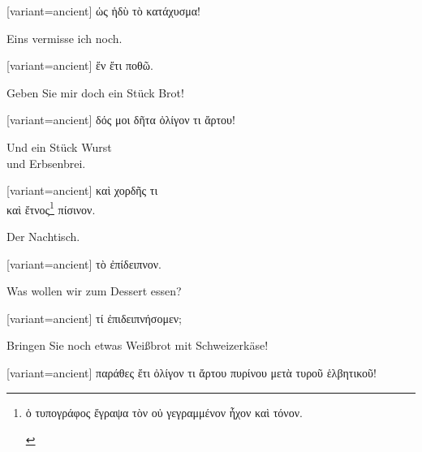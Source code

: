 \begin{greek}[variant=ancient]%
ὡς ἡδὺ τὸ κατάχυσμα!

\end{greek}%
\switchcolumn*

Eins vermisse ich noch.

\switchcolumn

\begin{greek}[variant=ancient]%
ἕν ἔτι ποθῶ.

\end{greek}%
\switchcolumn*

Geben Sie mir doch ein Stück Brot!

\switchcolumn

\begin{greek}[variant=ancient]%
δός μοι δῆτα ὀλίγον τι ἄρτου!

\end{greek}%
\switchcolumn*

Und ein Stück Wurst\\
und Erbsenbrei.

\switchcolumn

\begin{greek}[variant=ancient]%
καὶ χορδῆς τι\\
καὶ ἔτνος\footnote{\begin{latin}%
\textgreek[variant=ancient]{ὁ τυπογράφος ἔγραψα τὸν οὐ γεγραμμένον
ἦχον καὶ τόνον.}\end{latin}%
} πίσινον.

\end{greek}%
\switchcolumn*

Der Nachtisch.

\switchcolumn

\begin{greek}[variant=ancient]%
τὸ ἐπίδειπνον.

\end{greek}%
\switchcolumn*

Was wollen wir zum Dessert essen?

\switchcolumn

\begin{greek}[variant=ancient]%
τί ἐπιδειπνήσομεν;

\end{greek}%
\switchcolumn*

Bringen Sie noch etwas Weißbrot mit Schweizerkäse!

\switchcolumn

\begin{greek}[variant=ancient]%
παράθες ἔτι ὀλίγον τι ἄρτου πυρίνου μετὰ τυροῦ ἑλβητικοῦ!

\end{greek}%
\switchcolumn*

